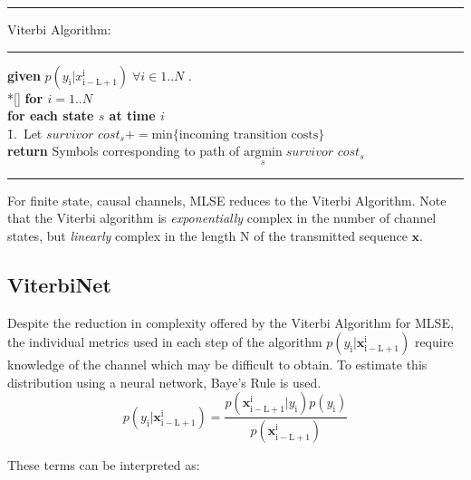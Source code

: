 \documentclass[12pt,a4paper]{report}
\begin{document}
    \noindent\rule[16pt]{\textwidth}{0.6pt}
	Viterbi Algorithm:

    \noindent\rule[10pt]{\textwidth}{0.4pt}
    {\footnotesize
    \begin{tabbing}
        {\bf given} $p(y_{\mathrm{i}}|x_{\mathrm{i-L+1}}^{\mathrm{i}}) \; \forall i \in {1..N}$ . \\*[\smallskipamount]
        {\bf for $i = 1..N $} \\
         \qquad \= {\bf for each state $s$ at time $i$}\\
        \qquad \qquad \= 1.\ Let $\textit{survivor cost}_{s}  += \text{min}\{\text{incoming transition costs}\}$ \\
        {\bf return} Symbols corresponding to path of $\underset{s}{\text{argmin}} \; \textit{survivor cost}_{s} $
    \end{tabbing}}
    \noindent\rule[10pt]{\textwidth}{0.4pt}


For finite state, causal channels, MLSE reduces to the Viterbi Algorithm. Note that the Viterbi algorithm is \emph{exponentially} complex in the number of channel states, but \emph{linearly} complex in the length N of the transmitted sequence $\mathbf{x}$. 


\subsection{ViterbiNet}
Despite the reduction in complexity offered by the Viterbi Algorithm for MLSE, the individual metrics used in each step of the algorithm 
$p(y_{\mathrm{i}}|\mathbf{x}_{\mathrm{i-L+1}}^{\mathrm{i}}) $ require knowledge of the channel which may be difficult to obtain. To estimate this distribution using a neural network, Baye's Rule is used. 
\begin{equation}
p(y_{\mathrm{i}}|\mathbf{x}_{\mathrm{i-L+1}}^{\mathrm{i}}) = 
\frac
{p(\mathbf{x}_{\mathrm{i-L+1}}^{\mathrm{i}}|y_{\mathrm{i}})p(y_{\mathrm{i}})}
{p(\mathbf{x}_{\mathrm{i-L+1}}^{\mathrm{i}})}
\end{equation}

These terms can be interpreted as:
\end{document}
